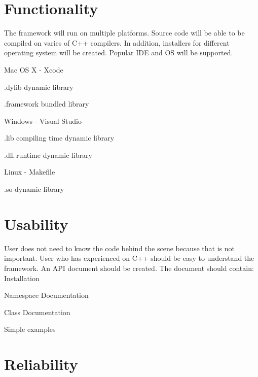 \hypertarget{_f_u_r_p_s_FURPSFunctionality}{}\section{Functionality}\label{_f_u_r_p_s_FURPSFunctionality}
The framework will run on multiple platforms. Source code will be able to be compiled on varies of C++ compilers. In addition, installers for different operating system will be created. Popular I\+D\+E and O\+S will be supported.
\begin{DoxyItemize}
\item Mac O\+S X -\/ Xcode
\begin{DoxyItemize}
\item .dylib dynamic library
\item .framework bundled library
\end{DoxyItemize}
\item Windows -\/ Visual Studio
\begin{DoxyItemize}
\item .lib compiling time dynamic library
\item .dll runtime dynamic library
\end{DoxyItemize}
\item Linux -\/ Makefile
\begin{DoxyItemize}
\item .so dynamic library
\end{DoxyItemize}
\end{DoxyItemize}\hypertarget{_f_u_r_p_s_FURPSUsability}{}\section{Usability}\label{_f_u_r_p_s_FURPSUsability}
User does not need to know the code behind the scene because that is not important. User who has experienced on C++ should be easy to understand the framework. An A\+P\+I document should be created. The document should contain\+: Installation
\begin{DoxyItemize}
\item Namespace Documentation
\item Class Documentation
\item Simple examples
\end{DoxyItemize}\hypertarget{_f_u_r_p_s_FURPSReliability}{}\section{Reliability}\label{_f_u_r_p_s_FURPSReliability}
